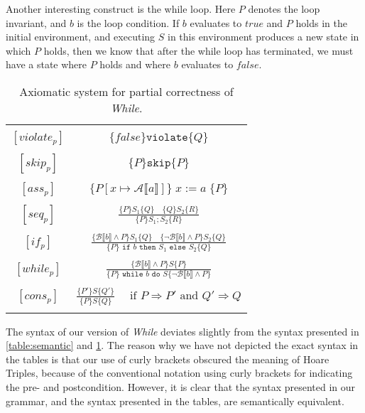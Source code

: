 Another interesting construct is the while loop.
Here $P$ denotes the loop invariant, and $b$ is the loop condition.
If $b$ evaluates to $true$ and $P$ holds in the initial environment, and executing $S$ in this environment produces a new state in which $P$ holds, then we know that after the while loop has terminated, we must have a state where $P$ holds and where $b$ evaluates to $false$.

\begin{table}[h!]
\centering
\begin{tabular}{|c c|} 
 \hline
	& \\
 $[violate_p ]$ & $\{ false \} \texttt{violate} \{ Q \}$ \\ 
	& \\
 $[skip_p ]$ & $\{ P \} \texttt{skip} \{ P \}$ \\ 
	& \\
 $[ass_p ]$ & $\{ P[x \mapsto \mathcal{A} \llbracket a \rrbracket ] \} \; x := a \; \{ P \}$ \\ 
	& \\
 $[seq_p ]$ & 
		$\frac{\{ P \} S_1 \{Q \} \quad \{ Q\} S_2 \{ R \}}{\{ P \} S_1;S_2 \{ R \}}$ \\ 
	& \\
 $[if_p ]$ & 
		$\frac{ \{\mathcal{B} \llbracket b \rrbracket \land P \} S_1 \{ Q \} \quad 
           \{ \neg \mathcal{B} \llbracket b \rrbracket \land P\} S_2 \{ Q \} }
          {\{P\} \texttt{ if } b \texttt{ then } S_1 \texttt{ else } S_2 \{Q\}}$ \\
	& \\
 $[while_p ]$ & 
		$\frac{ \{\mathcal{B} \llbracket b \rrbracket \land P \} S \{ P \}}
          {\{P\} \texttt{ while } b \texttt{ do } S 
           \{\neg \mathcal{B} \llbracket b \rrbracket \land P\}}$ \\
	& \\
 $[cons_p ]$ & 
		$\frac{ \{P'\} S \{Q'\}}{\{P\} S \{Q\}} \quad 
     \text{ if } P \Rightarrow P' \text{ and } Q' \Rightarrow Q $ \\
	& \\
 \hline
\end{tabular}
\caption{Axiomatic system for partial correctness of \textit{While}\cite{nielson}.}
\label{table:axiomatic}
\end{table}

The syntax of our version of \textit{While} deviates slightly from the syntax presented in \cref{table:semantic} and \cref{table:axiomatic}.
The reason why we have not depicted the exact syntax in the tables is that our use of curly brackets obscured the meaning of Hoare Triples, because of the conventional notation using curly brackets for indicating the pre- and postcondition.
However, it is clear that the syntax presented in our grammar, and the syntax presented in the tables, are semantically equivalent. 

